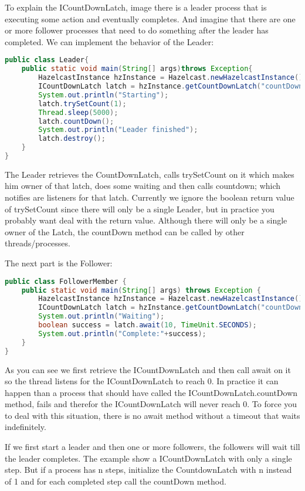 To explain the ICountDownLatch, image there is a leader process that is executing some action and eventually completes. And imagine that there are one or more follower processes that need to do something after the leader has completed. We can implement the behavior of the Leader:
\begin{lstlisting}[language=java]
public class Leader{
    public static void main(String[] args)throws Exception{
        HazelcastInstance hzInstance = Hazelcast.newHazelcastInstance();
        ICountDownLatch latch = hzInstance.getCountDownLatch("countDownLatch");      
        System.out.println("Starting");
        latch.trySetCount(1); 
        Thread.sleep(5000);
        latch.countDown();
        System.out.println("Leader finished");
        latch.destroy();
    }
}
\end{lstlisting}
The Leader retrieves the CountDownLatch, calls trySetCount on it which makes him owner of that latch, does some waiting and then calls countdown; which notifies are listeners for that latch. Currently we ignore the boolean return value of trySetCount since there will only be a single Leader, but in practice you probably want deal with the return value. Although there will only be a single owner of the Latch, the countDown method can be called by other threads/processes.

The next part is the Follower:
\begin{lstlisting}[language=java]
public class FollowerMember {
    public static void main(String[] args) throws Exception {
        HazelcastInstance hzInstance = Hazelcast.newHazelcastInstance();
        ICountDownLatch latch = hzInstance.getCountDownLatch("countDownLatch");
        System.out.println("Waiting");
        boolean success = latch.await(10, TimeUnit.SECONDS);
        System.out.println("Complete:"+success);
    }
}
\end{lstlisting}
As you can see we first retrieve the ICountDownLatch and then call await on it so the thread listens for the ICountDownLatch to reach 0. In practice it can happen than a process that should have called the ICountDownLatch.countDown method, fails and therefor the ICountDownLatch will never reach 0. To force you to deal with this situation, there is no await method without a timeout that waits indefinitely. 

If we first start a leader and then one or more followers, the followers will wait till the leader completes. The example show a ICountDownLatch with only a single step. But if a process has n steps, initialize the CountdownLatch with n instead of 1 and for each completed step call the countDown method.

